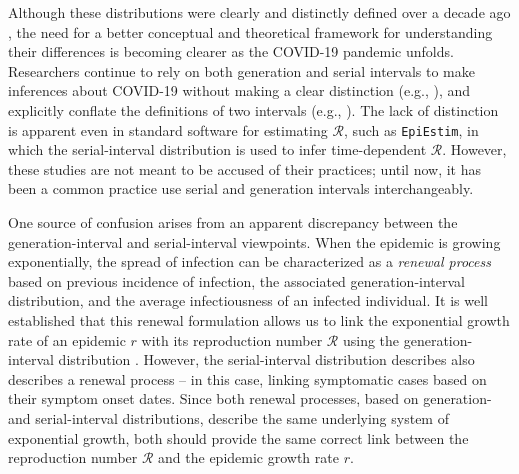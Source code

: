 \documentclass[12pt]{article}
\newcommand{\RR}{\ensuremath{{\mathcal R}}\xspace}
\begin{document}
Although these distributions were clearly and distinctly defined over a decade ago \citep{svensson2007note}, 
the need for a better conceptual and theoretical framework for understanding their differences is becoming clearer as the COVID-19 pandemic unfolds.
Researchers continue to rely on both generation and serial intervals to make inferences about COVID-19 without making a clear distinction (e.g., \cite{tempvar,du2020serial,he2020temporal,wu2020nowcasting,zhao2020serial}), and explicitly conflate the definitions of two intervals (e.g., \cite{anderson2020will,hellewell2020feasibility}).
The lack of distinction is apparent even in standard software for estimating \RR, such as \texttt{EpiEstim}, in which the serial-interval distribution is used to infer time-dependent \RR \citep{thompson2019improved}.
However, these studies are not meant to be accused of their practices; until now, it has been a common practice use serial and generation intervals interchangeably.

One source of confusion arises from an apparent discrepancy between the generation-interval and serial-interval viewpoints.
When the epidemic is growing exponentially, the spread of infection can be characterized as a \emph{renewal process} based on previous incidence of infection, the associated generation-interval distribution, and the average infectiousness of an infected individual.
It is well established that this renewal formulation allows us to link the exponential growth rate of an epidemic $r$ with its reproduction number \RR using the generation-interval distribution \citep{wallinga2007generation}.
However, the serial-interval distribution describes also describes a renewal process -- in this case, linking symptomatic cases based on their symptom onset dates.
Since both renewal processes, based on generation- and serial-interval distributions, describe the same underlying system of exponential growth, both should provide the same correct link between the reproduction number \RR and the epidemic growth rate $r$.
\end{document}
